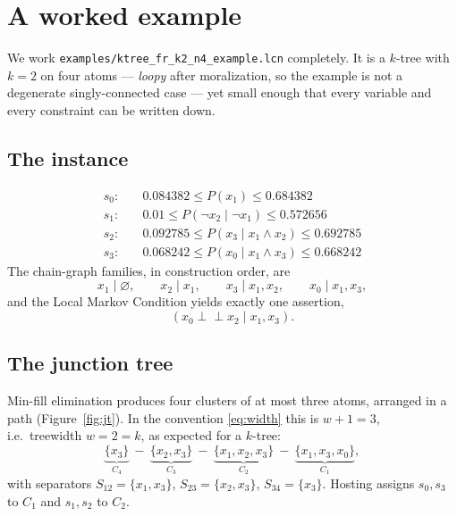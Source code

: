 \documentclass[11pt]{article}
\theoremstyle{definition}
\newcommand{\indep}{\perp\!\!\!\perp}
\begin{document}
\section{A worked example}\label{sec:example}

We work \texttt{examples/ktree\_fr\_k2\_n4\_example.lcn} completely. It is a
$k$-tree with $k=2$ on four atoms --- \emph{loopy} after moralization, so the
example is not a degenerate singly-connected case --- yet small enough that every
variable and every constraint can be written down.

\subsection{The instance}

\begin{align*}
s_0:&\quad 0.084382 \le P(x_1) \le 0.684382\\
s_1:&\quad 0.01 \le P(\lnot x_2 \mid \lnot x_1) \le 0.572656\\
s_2:&\quad 0.092785 \le P(x_3 \mid x_1\wedge x_2) \le 0.692785\\
s_3:&\quad 0.068242 \le P(x_0 \mid x_1\wedge x_3) \le 0.668242
\end{align*}
The chain-graph families, in construction order, are
\[
  x_1\mid\varnothing,\qquad x_2\mid x_1,\qquad x_3\mid x_1,x_2,\qquad
  x_0\mid x_1,x_3,
\]
and the Local Markov Condition yields exactly one assertion,
\[
  (x_0\indep x_2\mid x_1,x_3).
\]

\subsection{The junction tree}

Min-fill elimination produces four clusters of at most three atoms, arranged in a
path (Figure~\ref{fig:jt}). In the convention \eqref{eq:width} this is
$w+1=3$, i.e.\ treewidth $w=2=k$, as expected for a $k$-tree:
\[
  \underbrace{\{x_3\}}_{C_4}\ -\
  \underbrace{\{x_2,x_3\}}_{C_3}\ -\
  \underbrace{\{x_1,x_2,x_3\}}_{C_2}\ -\
  \underbrace{\{x_1,x_3,x_0\}}_{C_1},
\]
with separators $S_{12}=\{x_1,x_3\}$, $S_{23}=\{x_2,x_3\}$, $S_{34}=\{x_3\}$.
Hosting assigns $s_0,s_3$ to $C_1$ and $s_1,s_2$ to $C_2$.
\end{document}
